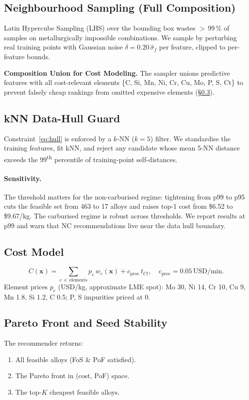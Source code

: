 \documentclass[10pt,a4paper]{article} %
\begin{document}
\subsection{Neighbourhood Sampling (Full Composition)}
Latin Hypercube Sampling (LHS) over the bounding box wastes $>$\,99\,\% of samples on metallurgically impossible
combinations. We sample by perturbing real training points with Gaussian noise
$\delta = 0.20\,\hat{\sigma}_f$ per feature, clipped to per-feature bounds.

\textbf{Composition Union for Cost Modeling.}
The sampler unions predictive features with all cost-relevant elements \{C, Si, Mn, Ni, Cr, Cu, Mo, P, S, Ct\} to prevent falsely cheap rankings from omitted expensive elements (§\ref{sec:cost}).


\subsection{kNN Data-Hull Guard}
Constraint~\eqref{eq:hull} is enforced by a $k$-NN ($k=5$) filter. We standardise the
training features, fit kNN, and reject any candidate whose mean 5-NN distance exceeds the
99\textsuperscript{th} percentile of training-point self-distances.

\paragraph{Sensitivity.} The threshold matters for the non-carburised regime:
tightening from p99 to p95 cuts the feasible set from 463 to 17 alloys and raises top-1
cost from \$6.52 to \$9.67/kg. The carburised regime is robust across thresholds. We
report results at p99 and warn that NC recommendations live
near the data hull boundary.

\subsection{Cost Model}\label{sec:cost}
\begin{equation}
  C(\mathbf{x}) = \sum_{e\,\in\,\text{elements}} p_e\,w_e(\mathbf{x})
              + c_{\text{proc}}\,t_{Ct}, \quad c_{\text{proc}} = 0.05\,\text{USD/min}.
\end{equation}
Element prices $p_e$ (USD/kg, approximate LME spot): Mo 30, Ni 14, Cr 10, Cu 9, Mn 1.8,
Si 1.2, C 0.5; P, S impurities priced at 0.

\subsection{Pareto Front and Seed Stability}
The recommender returns:
\begin{enumerate}[nosep]
  \item All feasible alloys (FoS \& PoF satisfied).
  \item The Pareto front in (cost, PoF) space.
  \item The top-$K$ cheapest feasible alloys.
\end{enumerate}
\end{document}

